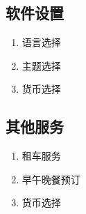 \documentclass[18pt]{article}
\begin{document}
	\subsection{软件设置}
	\begin{enumerate}
		\item 语言选择
		\item 主题选择
		\item 货币选择
	\end{enumerate}
	
	\subsection{其他服务}
	\begin{enumerate}
		\item 租车服务
		\item 早午晚餐预订
		\item 货币选择
	\end{enumerate}

	
\end{document}

